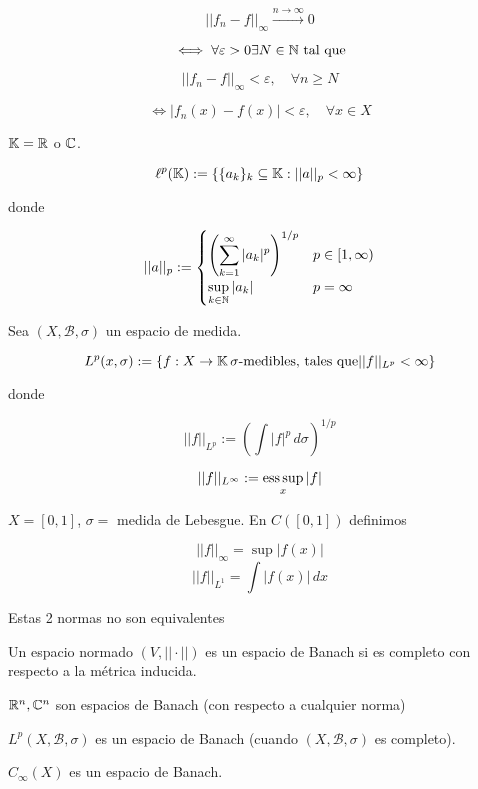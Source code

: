 \documentclass[../Apunte.tex]{subfiles}
\begin{document}
\[||f_n-f||_\infty\xrightarrow{n\to\infty} 0\]

\[\iff \forall \varepsilon>0 \exists N\in\mathbb{N}\text{ tal que}\]

\[||f_n-f||_\infty<\varepsilon,\quad \forall n\geq N\]

\[\iff |f_n(x)-f(x)|<\varepsilon,\quad \forall x\in X\]

\begin{fexample}
    $\mathbb{K}=\mathbb{R}$ o $\mathbb{C}$.

    \[\ell^p(\mathbb{K}):=\{\{a_k\}_k \subseteq \mathbb{K}: ||a||_p<\infty\}\]

    donde

    \[||a||_p:=\begin{cases}\left(\displaystyle\sum_{k=1}^\infty |a_k|^p\right)^{1/p}&p\in [1,\infty)\\
    \displaystyle\sup_{k\in\mathbb{N}} |a_k|& p=\infty\end{cases}\]
\end{fexample}

Sea $(X,\mathcal{B},\sigma)$ un espacio de medida.

\[L^p(x,\sigma):=\{f:X\to\mathbb{K} \, \sigma\text{-medibles, tales que} ||f||_{L^p}<\infty\}\]

donde 

\[||f||_{L^p}:= \left(\int |f|^p\,d\sigma\right)^{1/p}\]

\[||f||_{L^\infty}:=\operatorname*{ess\,sup}_x |f|\]

\begin{fexample}
    $X=[0,1]$, $\sigma=$ medida de Lebesgue. En $C([0,1])$ definimos

    \[||f||_\infty =\sup |f(x)|\]
    \[||f||_{L^1}=\int |f(x)|\,dx\]

    Estas 2 normas \color{red} no son equivalentes \color{black}
\end{fexample}

\begin{fdefinition}
    Un espacio normado $(V,||\cdot||)$ es un espacio de Banach si es \color{red} completo \color{black} con respecto a la métrica inducida.
\end{fdefinition}

\begin{fexample}
    $\mathbb{R}^n,\mathbb{C}^n$ son espacios de Banach (con respecto a cualquier norma)
    
    $L^p(X,\mathcal{B},\sigma)$ es un espacio de Banach (cuando $(X,\mathcal{B},\sigma)$ es completo).
\end{fexample}

\begin{fproposition}
    $C_\infty(X)$ es un espacio de Banach.
\end{fproposition}
\end{document}
